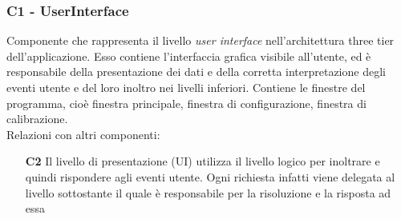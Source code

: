 \subsubsection{C1 - UserInterface} \label{sec:c1}
Componente che rappresenta il livello \textit{user interface} nell'architettura three tier dell'applicazione. Esso contiene l'interfaccia grafica visibile all'utente, ed è responsabile della presentazione dei dati e della corretta interpretazione degli eventi utente e del loro inoltro nei livelli inferiori. Contiene le finestre del programma, cioè finestra principale, finestra di configurazione, finestra di calibrazione. \\
Relazioni con altri componenti: 
\begin{itemize} 
\item [\textbf{C2}]
Il livello di presentazione (UI) utilizza il livello logico per inoltrare e quindi rispondere agli eventi utente. Ogni richiesta infatti viene delegata al livello sottostante il quale è responsabile per la risoluzione e la risposta ad essa 
\end{itemize} 

